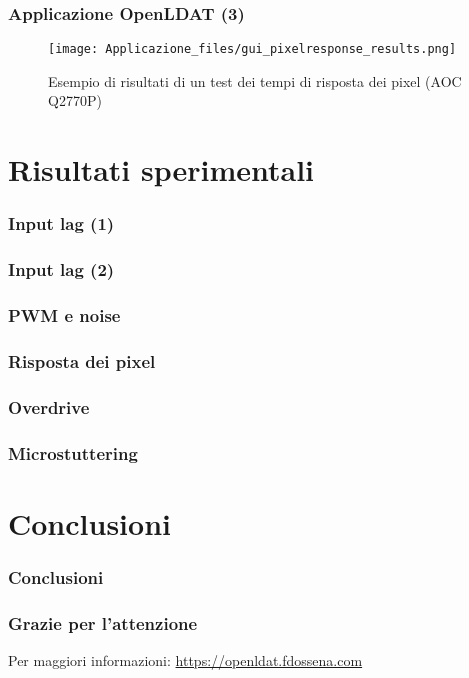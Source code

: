 \documentclass{beamer}
\begin{document}
\begin{frame}
	\frametitle{Applicazione OpenLDAT (3)}
	\begin{figure}
		\texttt{[image: Applicazione\_files/gui\_pixelresponse\_results.png]}
		\caption*{Esempio di risultati di un test dei tempi di risposta dei pixel (AOC Q2770P)}
	\end{figure}
	
\end{frame}

\section{Risultati sperimentali}
\begin{frame}
	\frametitle{Input lag (1)}
	\lipsum[1]
\end{frame}
\begin{frame}
	\frametitle{Input lag (2)}
	\lipsum[1]
\end{frame}
\begin{frame}
	\frametitle{PWM e noise}
	\lipsum[1]
\end{frame}
\begin{frame}
	\frametitle{Risposta dei pixel}
	\lipsum[1]
\end{frame}
\begin{frame}
	\frametitle{Overdrive}
	\lipsum[1]
\end{frame}
\begin{frame}
	\frametitle{Microstuttering}
	\lipsum[1]
\end{frame}

\section{Conclusioni}
\begin{frame}
	\frametitle{Conclusioni}
	\lipsum[1]
\end{frame}
\begin{frame}
	\frametitle{Grazie per l'attenzione}
	\centering
	Per maggiori informazioni:
	\textcolor{blue}{\url{https://openldat.fdossena.com}}
\end{frame}
\end{document}
